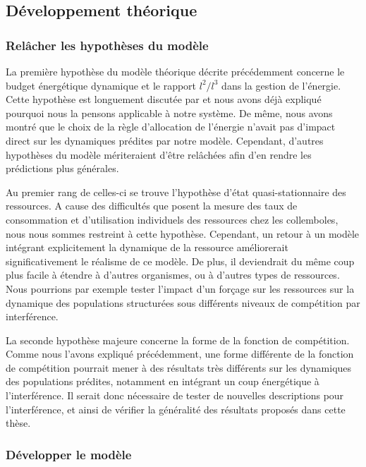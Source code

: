 \subsection{Développement théorique}

\subsubsection{Relâcher les hypothèses du modèle}

La première hypothèse du modèle théorique décrite précédemment concerne le
budget énergétique dynamique et le rapport $l^2 / l^3$ dans la gestion de
l'énergie. Cette hypothèse est longuement discutée par \textcites{kooijman2000a}
et nous avons déjà expliqué pourquoi nous la pensons applicable à notre système.
De même, nous avons montré que le choix de la règle d'allocation de l'énergie
n'avait pas d'impact direct sur les dynamiques prédites par notre modèle.
Cependant, d'autres hypothèses du modèle mériteraient d'être relâchées afin
d'en rendre les prédictions plus générales. 

Au premier rang de celles-ci se trouve l'hypothèse d'état quasi-stationnaire des
ressources. A cause des difficultés que posent la mesure des taux de
consommation et d'utilisation individuels des ressources chez les collemboles,
nous nous sommes restreint à cette hypothèse. Cependant, un retour à un modèle
intégrant explicitement la dynamique de la ressource améliorerait
significativement le réalisme de ce modèle. De plus, il deviendrait du
même coup plus facile à étendre à d'autres organismes, ou à d'autres types de
ressources. Nous pourrions par exemple tester l'impact d'un forçage sur les
ressources sur la dynamique des populations structurées sous différents niveaux
de compétition par interférence. 

La seconde hypothèse majeure concerne la forme de la fonction de compétition.
Comme nous l'avons expliqué précédemment, une forme différente de la fonction de
compétition pourrait mener à des résultats très différents sur les dynamiques
des populations prédites, notamment en intégrant un coup énergétique à
l'interférence. Il serait donc nécessaire de tester de nouvelles descriptions
pour l'interférence, et ainsi de vérifier la généralité des résultats proposés
dans cette thèse. 

\subsubsection{Développer le modèle}

